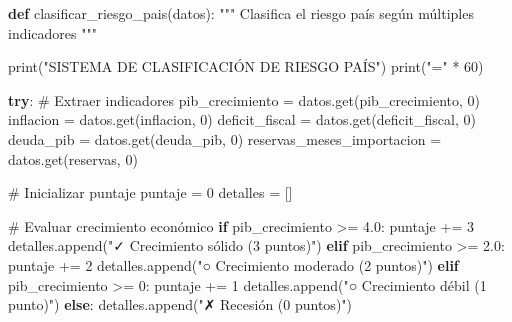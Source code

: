 \documentclass[
  doc,
  floatsintext,
  longtable,
  a4paper,
  nolmodern,
  notxfonts,
  notimes,
  12pt,
  colorlinks=true,linkcolor=blue,citecolor=blue,urlcolor=blue]{apa7}
\newenvironment{Shaded}{\begin{snugshade}}{\end{snugshade}}
\newcommand{\BuiltInTok}[1]{\textcolor[rgb]{0.00,0.23,0.31}{#1}}
\newcommand{\CommentTok}[1]{\textcolor[rgb]{0.37,0.37,0.37}{#1}}
\newcommand{\ControlFlowTok}[1]{\textcolor[rgb]{0.00,0.23,0.31}{\textbf{#1}}}
\newcommand{\DecValTok}[1]{\textcolor[rgb]{0.68,0.00,0.00}{#1}}
\newcommand{\FloatTok}[1]{\textcolor[rgb]{0.68,0.00,0.00}{#1}}
\newcommand{\KeywordTok}[1]{\textcolor[rgb]{0.00,0.23,0.31}{\textbf{#1}}}
\newcommand{\NormalTok}[1]{\textcolor[rgb]{0.00,0.23,0.31}{#1}}
\newcommand{\OperatorTok}[1]{\textcolor[rgb]{0.37,0.37,0.37}{#1}}
\newcommand{\StringTok}[1]{\textcolor[rgb]{0.13,0.47,0.30}{#1}}
\begin{document}
\begin{Shaded}
\begin{Highlighting}[]
\KeywordTok{def}\NormalTok{ clasificar\_riesgo\_pais(datos):}
    \CommentTok{"""}
\CommentTok{    Clasifica el riesgo país según múltiples indicadores}
\CommentTok{    """}
    
    \BuiltInTok{print}\NormalTok{(}\StringTok{"SISTEMA DE CLASIFICACIÓN DE RIESGO PAÍS"}\NormalTok{)}
    \BuiltInTok{print}\NormalTok{(}\StringTok{"="} \OperatorTok{*} \DecValTok{60}\NormalTok{)}
    
    \ControlFlowTok{try}\NormalTok{:}
        \CommentTok{\# Extraer indicadores}
\NormalTok{        pib\_crecimiento }\OperatorTok{=}\NormalTok{ datos.get(}\StringTok{\textquotesingle{}pib\_crecimiento\textquotesingle{}}\NormalTok{, }\DecValTok{0}\NormalTok{)}
\NormalTok{        inflacion }\OperatorTok{=}\NormalTok{ datos.get(}\StringTok{\textquotesingle{}inflacion\textquotesingle{}}\NormalTok{, }\DecValTok{0}\NormalTok{)}
\NormalTok{        deficit\_fiscal }\OperatorTok{=}\NormalTok{ datos.get(}\StringTok{\textquotesingle{}deficit\_fiscal\textquotesingle{}}\NormalTok{, }\DecValTok{0}\NormalTok{)}
\NormalTok{        deuda\_pib }\OperatorTok{=}\NormalTok{ datos.get(}\StringTok{\textquotesingle{}deuda\_pib\textquotesingle{}}\NormalTok{, }\DecValTok{0}\NormalTok{)}
\NormalTok{        reservas\_meses\_importacion }\OperatorTok{=}\NormalTok{ datos.get(}\StringTok{\textquotesingle{}reservas\textquotesingle{}}\NormalTok{, }\DecValTok{0}\NormalTok{)}
        
        \CommentTok{\# Inicializar puntaje}
\NormalTok{        puntaje }\OperatorTok{=} \DecValTok{0}
\NormalTok{        detalles }\OperatorTok{=}\NormalTok{ []}
        
        \CommentTok{\# Evaluar crecimiento económico}
        \ControlFlowTok{if}\NormalTok{ pib\_crecimiento }\OperatorTok{\textgreater{}=} \FloatTok{4.0}\NormalTok{:}
\NormalTok{            puntaje }\OperatorTok{+=} \DecValTok{3}
\NormalTok{            detalles.append(}\StringTok{"✓ Crecimiento sólido (3 puntos)"}\NormalTok{)}
        \ControlFlowTok{elif}\NormalTok{ pib\_crecimiento }\OperatorTok{\textgreater{}=} \FloatTok{2.0}\NormalTok{:}
\NormalTok{            puntaje }\OperatorTok{+=} \DecValTok{2}
\NormalTok{            detalles.append(}\StringTok{"○ Crecimiento moderado (2 puntos)"}\NormalTok{)}
        \ControlFlowTok{elif}\NormalTok{ pib\_crecimiento }\OperatorTok{\textgreater{}=} \DecValTok{0}\NormalTok{:}
\NormalTok{            puntaje }\OperatorTok{+=} \DecValTok{1}
\NormalTok{            detalles.append(}\StringTok{"○ Crecimiento débil (1 punto)"}\NormalTok{)}
        \ControlFlowTok{else}\NormalTok{:}
\NormalTok{            detalles.append(}\StringTok{"✗ Recesión (0 puntos)"}\NormalTok{)}
        

\end{Highlighting}
\end{Shaded}
\end{document}
